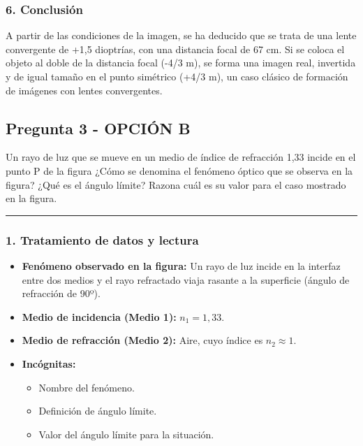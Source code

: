 \subsubsection*{6. Conclusión}
\begin{cajaconclusion}
A partir de las condiciones de la imagen, se ha deducido que se trata de una lente convergente de +1,5 dioptrías, con una distancia focal de 67 cm. Si se coloca el objeto al doble de la distancia focal (-4/3 m), se forma una imagen real, invertida y de igual tamaño en el punto simétrico (+4/3 m), un caso clásico de formación de imágenes con lentes convergentes.
\end{cajaconclusion}

\newpage
\subsection{Pregunta 3 - OPCIÓN B}
\label{subsec:3B_2016_jul_ext}
\begin{cajaenunciado}
Un rayo de luz que se mueve en un medio de índice de refracción 1,33 incide en el punto P de la figura ¿Cómo se denomina el fenómeno óptico que se observa en la figura? ¿Qué es el ángulo límite? Razona cuál es su valor para el caso mostrado en la figura.
\end{cajaenunciado}
\hrule

\subsubsection*{1. Tratamiento de datos y lectura}
\begin{itemize}
    \item \textbf{Fenómeno observado en la figura:} Un rayo de luz incide en la interfaz entre dos medios y el rayo refractado viaja rasante a la superficie (ángulo de refracción de 90º).
    \item \textbf{Medio de incidencia (Medio 1):} $n_1 = 1,33$.
    \item \textbf{Medio de refracción (Medio 2):} Aire, cuyo índice es $n_2 \approx 1$.
    \item \textbf{Incógnitas:}
        \begin{itemize}
            \item Nombre del fenómeno.
            \item Definición de ángulo límite.
            \item Valor del ángulo límite para la situación.
        \end{itemize}
\end{itemize}

